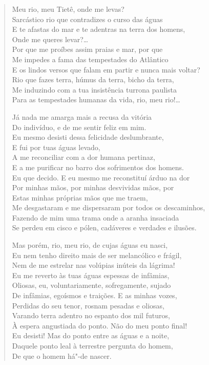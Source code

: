 \begin{verse}
Meu rio, meu Tietê, onde me levas?\\
Sarcástico rio que contradizes o curso das águas\\
E te afastas do mar e te adentras na terra dos homens,\\
Onde me queres levar?\ldots{}\\
Por que me proíbes assim praias e mar, por que\\
Me impedes a fama das tempestades do Atlântico\\
E os lindos versos que falam em partir e nunca mais voltar?\\
Rio que fazes terra, húmus da terra, bicho da terra,\\
Me induzindo com a tua insistência turrona paulista\\
Para as tempestades humanas da vida, rio, meu rio!\ldots{}

Já nada me amarga mais a recusa da vitória\\
Do indivíduo, e de me sentir feliz em mim.\\
Eu mesmo desisti dessa felicidade deslumbrante,\\
E fui por tuas águas levado,\\
A me reconciliar com a dor humana pertinaz,\\
E a me purificar no barro dos sofrimentos dos homens.\\
Eu que decido. E eu mesmo me reconstituí árduo na dor\\
Por minhas mãos, por minhas desvividas mãos, por\\
Estas minhas próprias mãos que me traem,\\
Me desgastaram e me dispersaram por todos os descaminhos,\\
Fazendo de mim uma trama onde a aranha insaciada\\
Se perdeu em cisco e pólen, cadáveres e verdades e ilusões.

Mas porém, rio, meu rio, de cujas águas eu nasci,\\
Eu nem tenho direito mais de ser melancólico e frágil,\\
Nem de me estrelar nas volúpias inúteis da lágrima!\\
Eu me reverto às tuas águas espessas de infâmias,\\
Oliosas, eu, voluntariamente, sofregamente, sujado\\
De infâmias, egoísmos e traições. E as minhas vozes,\\
Perdidas do seu tenor, rosnam pesadas e oliosas,\\
Varando terra adentro no espanto dos mil futuros,\\
À espera angustiada do ponto. Não do meu ponto final!\\
Eu desisti! Mas do ponto entre as águas e a noite,\\
Daquele ponto leal à terrestre pergunta do homem,\\
De que o homem há"-de nascer.


\end{verse}
